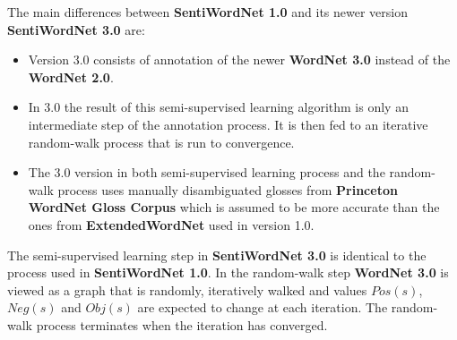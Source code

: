 \documentclass[a4paper,12pt]{article}
\begin{document}
  The main differences between \textbf{SentiWordNet 1.0} and its newer version
  \textbf{SentiWordNet 3.0} are:
  
  \begin{itemize}
    \item Version 3.0 consists of annotation of the newer \textbf{WordNet 3.0}
    instead of the \textbf{WordNet 2.0}.

    \item In 3.0 the result of this semi-supervised learning algorithm is only
    an intermediate step of the annotation process. It is then fed to an
    iterative random-walk process that is run to convergence.

    \item The 3.0 version in both semi-supervised learning process and the
    random-walk process uses manually disambiguated glosses from
    \textbf{Princeton WordNet Gloss Corpus} which is assumed to be more accurate
    than the ones from \textbf{ExtendedWordNet} used in version 1.0.
  \end{itemize}

  The semi-supervised learning step in \textbf{SentiWordNet 3.0} is identical
  to the process used in \textbf{SentiWordNet 1.0}. In the random-walk step
  \textbf{WordNet 3.0} is viewed as a graph that is randomly, iteratively
  walked and values $Pos(s)$, $Neg(s)$ and $Obj(s)$ are expected to change
  at each iteration. The random-walk process terminates when the iteration has
  converged.
\end{document}
